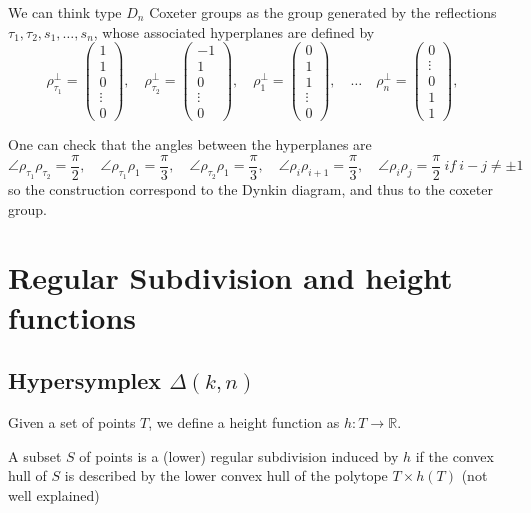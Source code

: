 \documentclass[leqno]{article}
\numberwithin{equation}{section}
\numberwithin{theorem}{section}
\begin{document}
We can think type $D_n$ Coxeter groups as the group generated by the reflections  $\tau_1, \tau_2, s_1, \ldots, s_n$, whose associated hyperplanes are defined by
\[
\rho_{\tau_1} ^\perp = \begin{pmatrix} 1 \\ 1 \\ 0 \\  \vdots \\ 0 \end{pmatrix} , \quad 
\rho_{\tau_2} ^\perp = \begin{pmatrix} -1 \\ 1 \\ 0\\ \vdots \\ 0 \end{pmatrix} , \quad 
\rho_1 ^\perp = \begin{pmatrix} 0 \\ 1 \\ 1\\ \vdots \\ 0 \end{pmatrix} , \quad \ldots \quad
\rho_n ^\perp = \begin{pmatrix} 0 \\ \vdots \\ 0 \\ 1\\ 1 \end{pmatrix} , \quad 
\] 

One can check that the angles between the hyperplanes are
\[
\angle \rho_{\tau_1} \rho _{\tau _2} = \frac{\pi}{2}, \quad
\angle \rho_{\tau_1} \rho _{1} = \frac{\pi}{3}, \quad
\angle \rho_{\tau_2} \rho _{1} = \frac{\pi}{3}, \quad
\angle \rho_i \rho _{i+1} = \frac{\pi}{3}, \quad 
\angle \rho_i \rho _{j} = \frac{\pi}{2}\ if\ i-j\neq \pm 1 \quad 
\] 
so the construction correspond to the Dynkin diagram, and thus to the coxeter group.


\section{Regular Subdivision and height functions}
\subsection{Hypersymplex $\Delta(k, n)$}
Given a set of points $T$, we define a height function as  $h:T \to \mathbb{R}$.

A subset $S$ of points is a (lower) regular subdivision induced by $h$ if the convex hull of $S$ is described by the lower convex hull of the polytope $T\times h(T)$ (not well explained)
\end{document}
